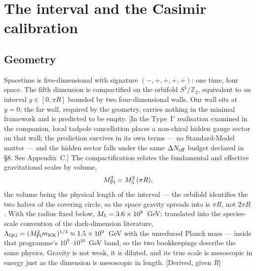 \section{The interval and the Casimir calibration}
\subsection{Geometry}
Spacetime is five-dimensional with signature $(-,+,+,+,+)$: one time, four space. The fifth dimension is compactified on the orbifold $S^{1}/\mathbb{Z}_{2}$, equivalent to an interval $y\in[0,\pi R]$ bounded by two four-dimensional walls. Our wall sits at $y=0$; the far wall, required by the geometry, carries nothing in the minimal framework and is predicted to be empty. [In the Type~I$'$ realisation examined in the companion, local tadpole cancellation places a non-chiral hidden gauge sector on that wall; the prediction survives in its own terms --- no Standard-Model matter --- and the hidden sector falls under the same $\Delta N_{\rm eff}$ budget declared in \S8. See Appendix~C.] The compactification relates the fundamental and effective gravitational scales by volume,
\begin{equation}
M_{\rm Pl}^{2}=M_5^{3}\,(\pi R),
\label{eq:volume}
\end{equation}
the volume being the physical length of the interval --- the orbifold identifies the two halves of the covering circle, so the space gravity spreads into is $\pi R$, not $2\pi R$. With the radius fixed below, $M_5=3.6\times10^{8}$~GeV; translated into the species-scale convention of the dark-dimension literature, $\Lambda_{\rm QG}=(M_{\rm Pl}^{2}m_{\rm KK})^{1/3}\approx1.5\times10^{9}$~GeV with the unreduced Planck mass --- inside that programme's $10^{9}$--$10^{10}$~GeV band, so the two bookkeepings describe the same physics. Gravity is not weak, it is diluted, and its true scale is mesoscopic in energy just as the dimension is mesoscopic in length. [Derived, given $R$]

